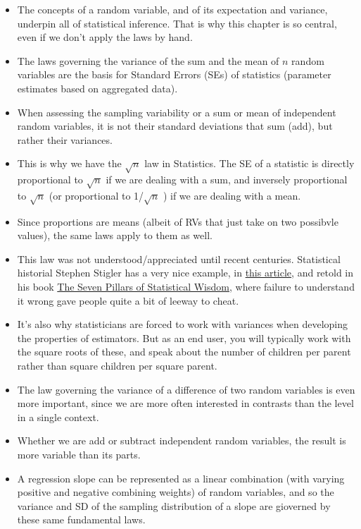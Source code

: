 \documentclass[]{book}
\begin{document}
\begin{itemize}
\item
  The concepts of a random variable, and of its expectation and variance, underpin all of statistical inference. That is why this chapter is so central, even if we don't apply the laws by hand.
\item
  The laws governing the variance of the sum and the mean of \(n\) random variables are the basis for Standard Errors (SEs) of statistics (parameter estimates based on aggregated data).
\item
  When assessing the sampling variability or a sum or mean of independent random variables, it is not their standard deviations that sum (add), but rather their variances.
\item
  This is why we have the \(\sqrt{n}\) law in Statistics. The SE of a statistic is directly proportional to \(\sqrt{n}\) if we are dealing with a sum, and inversely proportional to \(\sqrt{n}\) (or proportional to 1/\(\sqrt{n}\) ) if we are dealing with a mean.
\item
  Since proportions are means (albeit of RVs that just take on two possibvle values), the same laws apply to them as well.
\item
  This law was not understood/appreciated until recent centuries. Statistical historial Stephen Stigler has a very nice example, in \href{http://www.medicine.mcgill.ca/epidemiology/hanley/c323/pyx.pdf}{this article}, and retold in his book \href{https://www-degruyter-com.proxy3.library.mcgill.ca/view/title/521193}{The Seven Pillars of Statistical Wisdom}, where failure to understand it wrong gave people quite a bit of leeway to cheat.
\item
  It's also why statisticians are forced to work with variances when developing the properties of estimators. But as an end user, you will typically work with the square roots of these, and speak about the number of children per parent rather than square children per square parent.
\item
  The law governing the variance of a difference of two random variables is even more important, since we are more often interested in contrasts than the level in a single context.
\item
  Whether we are add or subtract independent random variables, the result is more variable than its parts.
\item
  A regression slope can be represented as a linear combination (with varying positive and negative combining weights) of random variables, and so the variance and SD of the sampling distribution of a slope are gioverned by these same fundamental laws.

\end{itemize}
\end{document}
